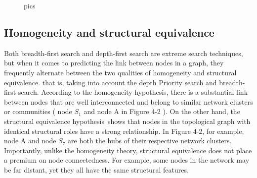 \documentclass[conference]{IEEEtran}
\begin{document}
\begin{figure}[htbp]
    \centering
    \centering
    \caption{ pics}
\end{figure}

\subsection{Homogeneity and structural equivalence}
\par
Both breadth-first search and depth-first search are extreme search techniques, but when it comes to predicting the link between nodes in a graph, they frequently alternate between the two qualities of homogeneity and structural equivalence. that is, taking into account the depth Priority search and breadth-first search. According to the homogeneity hypothesis, there is a substantial link between nodes that are well interconnected and belong to similar network clusters or communities ( node $S_1$ and node A in Figure 4-2 ). On the other hand, the structural equivalence hypothesis shows that nodes in the topological graph with identical structural roles have a strong relationship. In Figure 4-2, for example, node A and node $S_7$ are both the hubs of their respective network clusters. Importantly, unlike the homogeneity theory, structural equivalence does not place a premium on node connectedness. For example, some nodes in the network may be far distant, yet they all have the same structural features.
\end{document}

